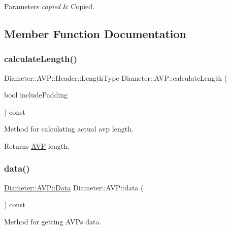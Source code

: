 \begin{DoxyParams}{Parameters}
{\em copied} & Copied. \\
\hline
\end{DoxyParams}


\subsection{Member Function Documentation}
\mbox{\label{classDiameter_1_1AVP_a755fe56553f0a9649c60fab98672a384}} 
\subsubsection{\texorpdfstring{calculate\+Length()}{calculateLength()}}
{\footnotesize\ttfamily Diameter\+::\+A\+V\+P\+::\+Header\+::\+Length\+Type Diameter\+::\+A\+V\+P\+::calculate\+Length (\begin{DoxyParamCaption}\item[{bool}]{include\+Padding }\end{DoxyParamCaption}) const}



Method for calculating actual avp length. 

\begin{DoxyReturn}{Returns}
\hyperlink{classDiameter_1_1AVP}{A\+VP} length. 
\end{DoxyReturn}
\mbox{\label{classDiameter_1_1AVP_aac6b58b95eef96ad4e3320d52a1b4093}} 
\subsubsection{\texorpdfstring{data()}{data()}\hspace{0.1cm}{\footnotesize\ttfamily [1/2]}}
{\footnotesize\ttfamily \hyperlink{classDiameter_1_1AVP_1_1Data}{Diameter\+::\+A\+V\+P\+::\+Data} Diameter\+::\+A\+V\+P\+::data (\begin{DoxyParamCaption}{ }\end{DoxyParamCaption}) const}



Method for getting A\+V\+Ps data. 

